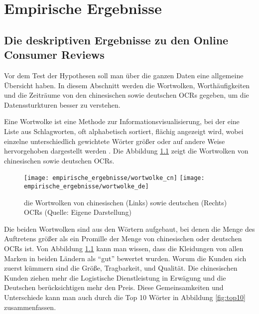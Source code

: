 \chapter{Empirische Ergebnisse} \label{Kapital4empirischeErgebnisse}
\section{Die deskriptiven Ergebnisse zu den Online Consumer Reviews}
Vor dem Test der Hypothesen soll man über die ganzen Daten eine allgemeine Übersicht haben. In diesem Abschnitt werden die Wortwolken, Worthäufigkeiten und die Zeiträume von den chinesischen sowie deutschen \ac{OCRs} gegeben, um die Datenssturkturen besser zu verstehen.

Eine Wortwolke ist eine Methode zur Informationsvisualisierung, bei der eine Liste aus Schlagworten, oft alphabetisch sortiert, flächig angezeigt wird, wobei einzelne unterschiedlich gewichtete Wörter größer oder auf andere Weise hervorgehoben dargestellt werden \citep{bateman2008seeing}. Die Abbildung \ref{fig:wortwolke} zeigt die Wortwolken von chinesischen sowie deutschen \ac{OCRs}.
\begin{figure}[h]
    \texttt{[image: empirische\_ergebnisse/wortwolke\_cn]}
    \endminipage\hfill
    \texttt{[image: empirische\_ergebnisse/wortwolke\_de]}
    \endminipage        
    \caption[die Wortwolken von chinesischen (Links) sowie deutschen (Rechts) OCRs]{die Wortwolken von chinesischen (Links) sowie deutschen (Rechts) \ac{OCRs} (Quelle: Eigene Darstellung)}
    \label{fig:wortwolke}
\end{figure}

Die beiden Wortwolken sind aus den Wörtern aufgebaut, bei denen die Menge des Auftretens größer als ein Promille der Menge von chinesischen oder deutschen \ac{OCRs} ist. Von Abbildung \ref{fig:wortwolke} kann man wissen, dass die Kleidungen von allen Marken in beiden Ländern als ``gut'' bewertet wurden. Worum die Kunden sich zuerst kümmern sind die Größe, Tragbarkeit, und Qualität. Die chinesischen Kunden ziehen mehr die Logistische Dienstleistung in Erwägung und die Deutschen berücksichtigen mehr den Preis. Diese Gemeinsamkeiten und Unterschiede kann man auch durch die Top 10 Wörter in Abbildung \ref{fig:top10} zusammenfassen.

